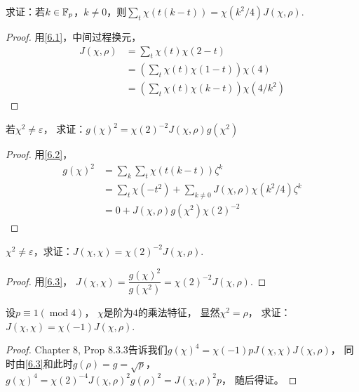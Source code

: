 \begin{exercise}\label{6.2}
    求证：若$k\in\mathbb{F}_p$，$k\neq0$，则$\sum_{t}\chi(t(k-t))=\chi(k^2/4)J(\chi,\rho)$.
\end{exercise}
\begin{proof}
    用\ref{6.1}，中间过程换元，
    \begin{align*}
        J(\chi,\rho)&=\sum_{t}\chi(t)\chi(2-t)\\
        &=\left( \sum_t\chi(t)\chi(1-t) \right)\chi(4)\\
        &=\left( \sum_t\chi(t)\chi(k-t) \right)\chi(4/k^2)
    \end{align*}
\end{proof}

\begin{exercise}\label{6.3}
    若$\chi^2\neq\varepsilon$，
    求证：$g(\chi)^2=\chi(2)^{-2}J(\chi,\rho)g(\chi^2)$
\end{exercise}
\begin{proof}
    用\ref{6.2}，
    \begin{align*}
        g(\chi)^2&=\sum_{k}\sum_t\chi(t(k-t))\zeta^k\\
        &=\sum_{t}\chi(-t^2)+\sum_{k\neq0}J(\chi,\rho)\chi(k^2/4)\zeta^k\\
        &=0+J(\chi,\rho)g(\chi^2)\chi(2)^{-2}
    \end{align*}
\end{proof}

\begin{exercise}\label{6.4}
    $\chi^2\neq\varepsilon$，求证：$J(\chi,\chi)=\chi(2)^{-2}J(\chi,\rho)$.
\end{exercise}
\begin{proof}
    用\ref{6.3}，
    $J(\chi,\chi)=\dfrac{g(\chi)^2}{g(\chi^2)}=\chi(2)^{-2}J(\chi,\rho)$.
\end{proof}

\begin{exercise}\label{6.5}
    设$p\equiv1(\operatorname{mod}4)$，
    $\chi$是阶为$4$的乘法特征，
    显然$\chi^2=\rho$，
    求证：$J(\chi,\chi)=\chi(-1)J(\chi,\rho)$.
\end{exercise}
\begin{proof}
    Chapter 8, Prop 8.3.3告诉我们$g(\chi)^4=\chi(-1)pJ(\chi,\chi)J(\chi,\rho)$，
    同时由\ref{6.3}和此时$g(\rho)=g=\sqrt{p}$，
    $g(\chi)^4=\chi(2)^{-4}J(\chi,\rho)^2g(\rho)^2=J(\chi,\rho)^2p$，
    随后得证。
\end{proof}

